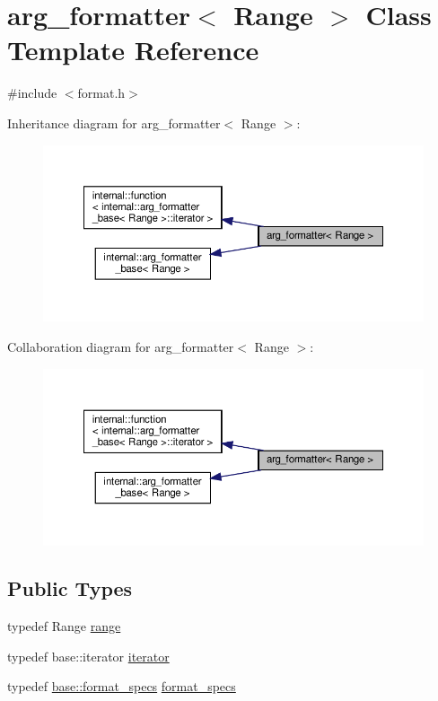\hypertarget{classarg__formatter}{}\section{arg\+\_\+formatter$<$ Range $>$ Class Template Reference}
\label{classarg__formatter}


{\ttfamily \#include $<$format.\+h$>$}



Inheritance diagram for arg\+\_\+formatter$<$ Range $>$\+:
\nopagebreak
\begin{figure}[H]
\begin{center}
\leavevmode
\includegraphics[width=350pt]{classarg__formatter__inherit__graph}
\end{center}
\end{figure}


Collaboration diagram for arg\+\_\+formatter$<$ Range $>$\+:
\nopagebreak
\begin{figure}[H]
\begin{center}
\leavevmode
\includegraphics[width=350pt]{classarg__formatter__coll__graph}
\end{center}
\end{figure}
\subsection*{Public Types}
\begin{DoxyCompactItemize}
\item 
typedef Range \hyperlink{classarg__formatter_a088e253d561ae361330c296be28af81b}{range}
\item 
typedef base\+::iterator \hyperlink{classarg__formatter_a8bdde3948f23cf63cdcb36b82a927199}{iterator}
\item 
typedef \hyperlink{classinternal_1_1arg__formatter__base_acff46f7da1afa536210eb77a2ea0d775}{base\+::format\+\_\+specs} \hyperlink{classarg__formatter_ab9ab9e2c7da495700a747c998e92f353}{format\+\_\+specs}
\end{DoxyCompactItemize}
